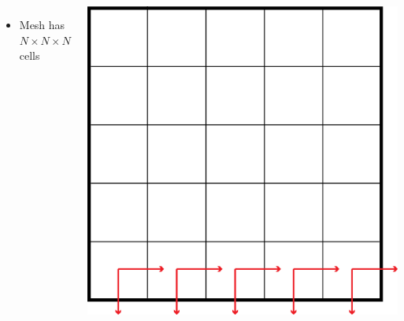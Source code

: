 \documentclass{beamer}
\begin{document}
\begin{frame}
\begin{columns}[c]
\begin{itemize}
    \item Mesh has $N\times N \times N$ cells
\end{itemize}

    \includegraphics[width=\textwidth, keepaspectratio]{ForwardSweep}
\end{columns}
\end{frame}
\end{document}
